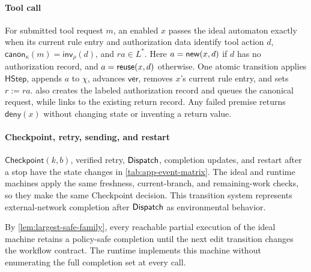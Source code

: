 \paragraph{Tool call}
For submitted tool request \(m\), an enabled \(x\) passes the ideal automaton exactly when its current rule entry and authorization data identify tool action \(d\), \(\mathsf{canon}_\kappa(m)=\mathsf{inv}_\rho(d)\), and \(ra\in L^*\).
Here \(a=\mathsf{new}(x,d)\) if \(d\) has no authorization record, and \(a=\mathsf{reuse}(x,d)\) otherwise.
One atomic transition applies \(\mathsf{HStep}\), appends \(a\) to \(\chi\), advances \(\mathsf{ver}\), removes \(x\)'s current rule entry, and sets \(r:=ra\).
\Fresh also creates the labeled authorization record and queues the canonical request, while \Alias links to the existing return record.
Any failed premise returns \(\mathsf{deny}(x)\) without changing state or inventing a return value.

\paragraph{Checkpoint, retry, sending, and restart}
\(\mathsf{Checkpoint}(k,b)\), verified retry, \(\mathsf{Dispatch}\), completion updates, and restart after a stop have the state changes in \cref{tab:app-event-matrix}.
The ideal and runtime machines apply the same freshness, current-branch, and remaining-work checks, so they make the same Checkpoint decision.
This transition system represents external-network completion after \(\mathsf{Dispatch}\) as environmental behavior.

By \cref{lem:largest-safe-family}, every reachable partial execution of the ideal machine retains a policy-safe completion until the next edit transition changes the workflow contract.
The runtime implements this machine without enumerating the full completion set at every call.

